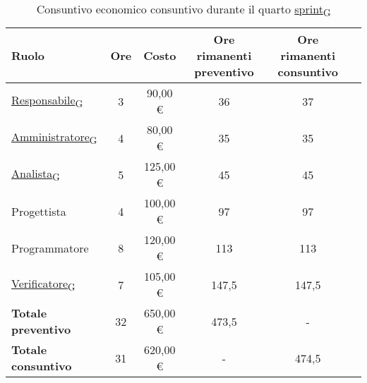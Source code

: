 \begin{table}[!h]
	\centering
	\begin{tabular}{ | l | c | c | c | c | c | }
		\hline
		\textbf{Ruolo}             & \textbf{Ore} & \textbf{Costo} & \textbf{Ore rimanenti preventivo} & \textbf{Ore rimanenti consuntivo} \\
		\hline
		\href{https://7last.github.io/docs/rtb/documentazione-interna/glossario\#responsabile}{Responsabile\textsubscript{G}}               & 3            & 90,00 €        & 36                                & 37                                \\
		\href{https://7last.github.io/docs/rtb/documentazione-interna/glossario\#amministratore}{Amministratore\textsubscript{G}}             & 4            & 80,00 €        & 35                                & 35                                \\
		\href{https://7last.github.io/docs/rtb/documentazione-interna/glossario\#analista}{Analista\textsubscript{G}}                   & 5            & 125,00 €       & 45                                & 45                                \\
		Progettista                & 4            & 100,00 €       & 97                                & 97                                \\
		Programmatore              & 8            & 120,00 €       & 113                               & 113                               \\
		\href{https://7last.github.io/docs/rtb/documentazione-interna/glossario\#verificatore}{Verificatore\textsubscript{G}}               & 7            & 105,00 €       & 147,5                             & 147,5                             \\
		\hline
		\textbf{Totale preventivo} & 32           & 650,00 €       & 473,5                             & -                                 \\
		\hline
		\textbf{Totale consuntivo} & 31           & 620,00 €       & -                                 & 474,5                             \\
		\hline
	\end{tabular}
	\caption{Consuntivo economico consuntivo durante il quarto \href{https://7last.github.io/docs/rtb/documentazione-interna/glossario\#sprint}{sprint\textsubscript{G}}}
	
\end{table}

